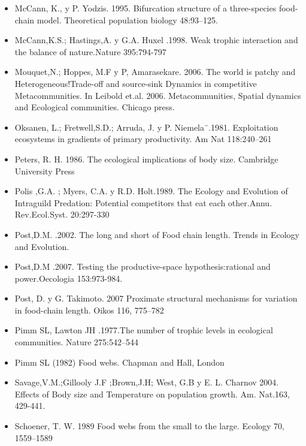\documentclass[a4paper,12pt]{article}
\begin{document}
\begin{itemize}
\item[] McCann, K., y P. Yodzis. 1995. Bifurcation structure of a three-species food-chain model. Theoretical population biology 48:93–125. \\ 
\item[] McCann,K.S.; Hastings,A. y G.A. Huxel .1998. Weak trophic interaction and the balance of nature.Nature 395:794-797\\
\item[] Mouquet,N.; Hoppes, M.F y P, Amarasekare. 2006. The world is patchy and Heterogeneous!Trade-off and source-sink Dynamics in competitive Metacommunities. In Leibold et.al. 2006. Metacommunities, Spatial dynamics and Ecological communities. Chicago press.\\
\item[] Oksanen, L.; Fretwell,S.D.; Arruda, J. y P. Niemela¨.1981. Exploitation ecosystems in gradients of primary productivity. Am Nat 118:240–261\\
\item[] Peters, R. H. 1986. The ecological implications of body size. Cambridge University Press\\
\item[] Polis ,G.A. ; Myers, C.A. y R.D. Holt.1989. The Ecology and Evolution of Intraguild Predation: Potential competitors that eat each other.Annu. Rev.Ecol.Syst. 20:297-330\\
\item[] Post,D.M. .2002. The long and short of Food chain length. Trends in Ecology and Evolution.\\
\item[] Post,D.M .2007. Testing the productive-space hypothesis:rational and power.Oecologia 153:973-984.\\
\item[] Post, D. y G. Takimoto. 2007 Proximate structural mechanisms for variation in food-chain length. Oikos 116, 775–782\\
\item[] Pimm SL, Lawton JH .1977.The number of trophic levels in ecological communities. Nature 275:542–544\\
\item[] Pimm SL (1982) Food webs. Chapman and Hall, London \\
\item[] Savage,V.M.;Gillooly J.F ;Brown,J.H; West, G.B y E. L. Charnov 2004. Effects of Body size and Temperature on population growth. Am. Nat.163, 429-441.\\
\item[] Schoener, T. W. 1989 Food webs from the small to the large. Ecology 70, 1559–1589\\

\end{itemize}
\end{document}
